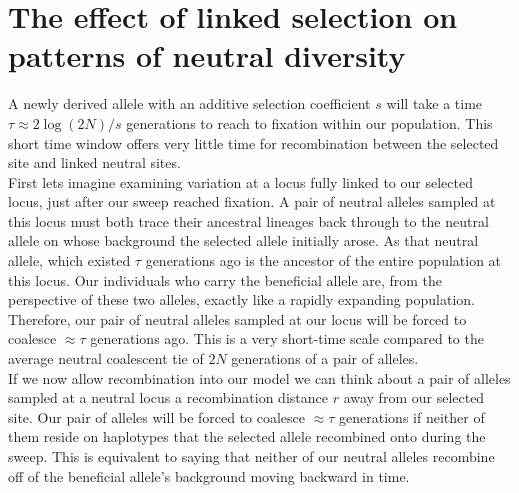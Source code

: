 \section{The effect of linked selection on patterns of neutral diversity}

A newly derived allele with an additive selection coefficient $s$ will
take a time $\tau \approx 2\log(2N)/s$ generations to reach to fixation
within our population. This short time window offers very little time
for recombination between the selected site and linked neutral
sites.  \\

First lets imagine examining variation at a locus fully linked
to our selected locus, just after our sweep reached fixation. A pair of neutral alleles sampled at this locus
must both trace their ancestral lineages back through to the neutral
allele on whose background the selected allele initially arose. As
that neutral allele, which existed $\tau$ generations ago is the
ancestor of the entire population at this locus. Our individuals who
carry the beneficial allele are, from the perspective of these two
alleles, exactly like a rapidly expanding population. Therefore, our
pair of neutral alleles sampled at our locus will be forced to
coalesce $\approx \tau$ generations ago. This is a very
short-time scale compared to the average neutral coalescent tie of
$2N$ generations of a pair of alleles.\\

If we now allow recombination into our model we can think about a pair
of alleles sampled at a neutral locus a recombination distance $r$
away from our selected site. Our pair of alleles will be forced to
coalesce $\approx \tau$ generations if neither of them reside on
haplotypes that the selected allele recombined onto during the
sweep. This is equivalent to saying that neither of our neutral
alleles recombine off of the beneficial allele's background moving
backward in time.\\

